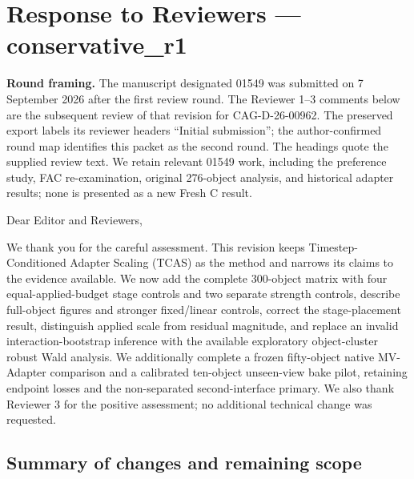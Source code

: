 \documentclass[
  10pt,
]{article}
\author{}
\date{}
\begin{document}
\hypertarget{response-to-reviewers-conservative_r1}{%
\section{Response to Reviewers ---
conservative\_r1}\label{response-to-reviewers-conservative_r1}}

\textbf{Round framing.} The manuscript designated 01549 was submitted on
7 September 2026 after the first review round. The Reviewer 1--3
comments below are the subsequent review of that revision for
CAG-D-26-00962. The preserved export labels its reviewer headers
``Initial submission''; the author-confirmed round map identifies this
packet as the second round. The headings quote the supplied review text.
We retain relevant 01549 work, including the preference study, FAC
re-examination, original 276-object analysis, and historical adapter
results; none is presented as a new Fresh C result.

Dear Editor and Reviewers,

We thank you for the careful assessment. This revision keeps
Timestep-Conditioned Adapter Scaling (TCAS) as the method and narrows
its claims to the evidence available. We now add the complete 300-object
matrix with four equal-applied-budget stage controls and two separate
strength controls, describe full-object figures and stronger
fixed/linear controls, correct the stage-placement result, distinguish
applied scale from residual magnitude, and replace an invalid
interaction-bootstrap inference with the available exploratory
object-cluster robust Wald analysis. We additionally complete a frozen
fifty-object native MV-Adapter comparison and a calibrated ten-object
unseen-view bake pilot, retaining endpoint losses and the non-separated
second-interface primary. We also thank Reviewer 3 for the positive
assessment; no additional technical change was requested.

\hypertarget{summary-of-changes-and-remaining-scope}{%
\subsection{Summary of changes and remaining
scope}\label{summary-of-changes-and-remaining-scope}}
\end{document}
